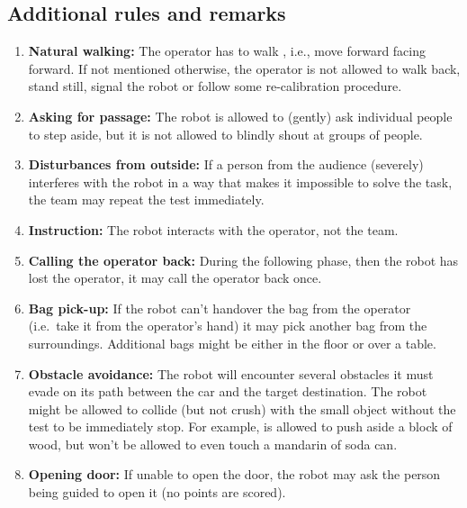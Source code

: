 \subsection{Additional rules and remarks}
\begin{enumerate}
  \item \textbf{Natural walking:} The operator has to walk , i.e., move forward facing forward. If not mentioned otherwise, the operator is not allowed to walk back, stand still, signal the robot or follow some re-calibration procedure.

  \item \textbf{Asking for passage:} The robot is allowed to (gently) ask individual people to step aside, but it is not allowed to blindly shout at groups of people.

  \item \textbf{Disturbances from outside:} If a person from the audience (severely) interferes with the robot in a way that makes it impossible to solve the task, the team may repeat the test immediately.

  \item \textbf{Instruction:} The robot interacts with the operator, not the team.

  \item \textbf{Calling the operator back:} During the following phase, then the robot has lost the operator, it may call the operator back once.

  \item \textbf{Bag pick-up:} If the robot can't handover the bag from the operator (i.e.~take it from the operator's hand) it may pick another bag from the surroundings. Additional bags might be either in the floor or over a table.

  \item \textbf{Obstacle avoidance:} The robot will encounter several obstacles it must evade on its path between the car and the target destination.
  The robot might be allowed to collide (but not crush) with the small object without the test to be immediately stop. For example, is allowed to push aside a block of wood, but won't be allowed to even touch a mandarin of soda can.

  \item \textbf{Opening door:} If unable to open the door, the robot may ask the person being guided to open it (no points are scored).

\end{enumerate}

